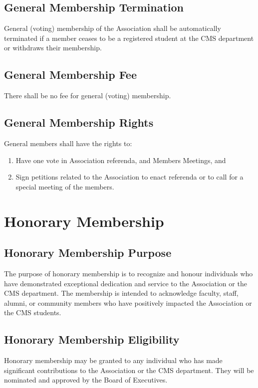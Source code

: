 \subsection{General Membership Termination}
General (voting) membership of the Association shall be 
automatically terminated if a member ceases to be a registered
student at the CMS department or withdraws their membership.

\subsection{General Membership Fee}
There shall be no fee for general (voting) membership.


\subsection{General Membership Rights}
General members shall have the rights to:
\begin{enumerate}

    \item Have one vote in Association referenda, and
    Members Meetings, and

    \item Sign petitions related to the Association to
    enact referenda or to call for a special meeting 
    of the members.

\end{enumerate}

\section{Honorary Membership}

\subsection{Honorary Membership Purpose}
The purpose of honorary membership is to recognize
and honour individuals who have demonstrated exceptional dedication
and service to the Association or the CMS department. The membership
is intended to acknowledge faculty, staff, alumni, or community members
who have positively impacted the Association or the CMS students.

\subsection{Honorary Membership Eligibility}
Honorary membership may be granted to any individual 
who has made significant contributions to the Association or the 
CMS department. They will be nominated and approved by the Board of 
Executives.

